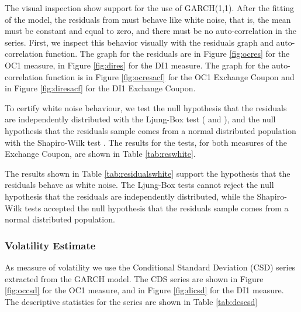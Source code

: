 \documentclass[cic,tc, english]{iiufrgs}
\begin{document}
    The visual inspection show support for the use of GARCH(1,1). After the fitting of the model, the residuals from must behave like white noise, that is, the mean must be constant and equal to zero, and there must be no auto-correlation in the series. First, we inspect this behavior visually with the residuals graph and auto-correlation function. The graph for the residuals are in Figure \ref{fig:ocres} for the OC1 measure, in Figure \ref{fig:dires} for the DI1 measure. The graph for the auto-correlation function is in Figure \ref{fig:ocresacf} for the OC1 Exchange Coupon and in Figure \ref{fig:diresacf} for the DI1 Exchange Coupon.

    

    

    

    

    To certify white noise behaviour, we test the null hypothesis that the residuals are independently distributed with the Ljung-Box test (\citet{boxpierce} and \citet{ljungbox}), and the null hypothesis that the residuals sample comes from a normal distributed population with the Shapiro-Wilk test \citet{shapirowilk}. The results for the tests, for both measures of the Exchange Coupon, are shown in Table \ref{tab:reswhite}.

    

    The results shown in Table \ref{tab:residualswhite} support the hypothesis that the residuals behave as white noise. The Ljung-Box tests cannot reject the null hypothesis that the residuals are independently distributed, while the Shapiro-Wilk tests accepted the null hypothesis that the residuals sample comes from a normal distributed population.

    \subsubsection{Volatility Estimate}

    As measure of volatility we use the Conditional Standard Deviation (CSD) series extracted from the GARCH model. The CDS series are shown in Figure \ref{fig:occsd} for the OC1 measure, and in Figure \ref{fig:dicsd} for the DI1 measure. The descriptive statistics for the series are shown in Table \ref{tab:descsd}

    
\end{document}
